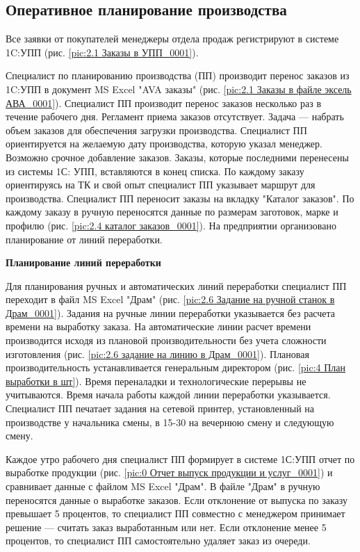 \subsection{Оперативное планирование производства}
\label{bp:OperPlan}

Все заявки от покупателей  менеджеры отдела продаж регистрируют в системе 1C:УПП (рис. \ref{pic:2.1 Заказы в УПП_0001}). 

Специалист по планированию производства (ПП) производит перенос заказов из 1C:УПП в документ MS Excel "AVA заказы" (рис. \ref{pic:2.1 Заказы в файле эксель АВА_0001}). Специалист ПП производит перенос заказов несколько раз в течение рабочего дня. Регламент приема заказов отсутствует. Задача --- набрать объем заказов для обеспечения загрузки производства. Специалист ПП ориентируется на желаемую дату производства, которую указал менеджер. Возможно срочное добавление заказов. Заказы, которые последними перенесены из системы  1С: УПП, вставляются в конец списка. По каждому заказу  ориентируясь на ТК и свой опыт  специалист ПП указывает маршрут для производства. Специалист ПП переносит заказы на вкладку "Каталог заказов". По каждому заказу в ручную переносятся данные по размерам заготовок, марке и профилю (рис. \ref{pic:2.4 каталог заказов_0001}). 
На предприятии организовано планирование от линий переработки. 

\textbf{Планирование линий переработки}

Для  планирования ручных и автоматических линий переработки специалист ПП переходит в файл MS Excel "Драм" (рис. \ref{pic:2.6 Задание на ручной станок в Драм_0001}). Задания на ручные линии переработки указывается без расчета времени на выработку заказа. На автоматические линии расчет времени производится исходя из плановой производительности  без учета сложности изготовления (рис. \ref{pic:2.6 задание на линию в Драм_0001}). Плановая производительность устанавливается генеральным директором (рис. \ref{pic:4 План выработки в шт}). Время переналадки и технологические перерывы не учитываются. Время начала работы каждой линии переработки указывается. 
Специалист ПП печатает задания на сетевой принтер, установленный на производстве у начальника смены, в 15-30 на вечернюю смену и следующую смену.

Каждое утро рабочего дня специалист ПП формирует в системе 1С:УПП отчет по выработке продукции (рис. \ref{pic:0 Отчет выпуск продукции и услуг_0001}) и сравнивает данные с файлом MS Excel "Драм". В файле  "Драм" в ручную переносятся данные о выработке заказов. Если отклонение от выпуска по заказу превышает 5 процентов, то специалист ПП совместно с менеджером принимает решение --- считать заказ выработанным или нет. Если отклонение менее 5 процентов, то специалист ПП самостоятельно удаляет заказ из очереди. 

